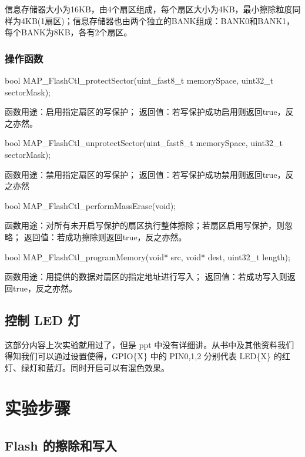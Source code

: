 \documentclass[a4paper,10pt,UTF8]{paper}
\numberwithin{equation}{section}
\numberwithin{figure}{section}
\begin{document}
信息存储器大小为16KB，由4个扇区组成，每个扇区大小为4KB，最小擦除粒度同样为4KB(1扇区)；信息存储器也由两个独立的BANK组成：BANK0和BANK1，每个BANK为8KB，各有2个扇区。

\subsubsection{操作函数}

\begin{ccode}
  bool MAP_FlashCtl_protectSector(uint_fast8_t memorySpace,
   uint32_t sectorMask);
\end{ccode}

函数用途：启用指定扇区的写保护；
返回值：若写保护成功启用则返回true，反之亦然。

\begin{ccode}
  bool MAP_FlashCtl_unprotectSector(uint_fast8_t memorySpace,
   uint32_t sectorMask);
\end{ccode}

函数用途：禁用指定扇区的写保护；
返回值：若写保护成功禁用则返回true，反之亦然

\begin{ccode}
  bool MAP_FlashCtl_performMassErase(void);
\end{ccode}

函数用途：对所有未开启写保护的扇区执行整体擦除；若扇区启用写保护，则忽略；
返回值：若成功擦除则返回true，反之亦然。

\begin{ccode}
  bool MAP_FlashCtl_programMemory(void* src, void* dest,
   uint32_t length);
\end{ccode}

函数用途：用提供的数据对扇区的指定地址进行写入；
返回值：若成功写入则返回true，反之亦然。

\subsection{控制 LED 灯}

这部分内容上次实验就用过了，但是 ppt 中没有详细讲。从书中及其他资料我们得知我们可以通过设置使得，GPIO\{X\} 中的 PIN0,1,2 分别代表 LED\{X\} 的红灯、绿灯和蓝灯。同时开启可以有混色效果。

\section{实验步骤}

\subsection{Flash 的擦除和写入}
\end{document}

